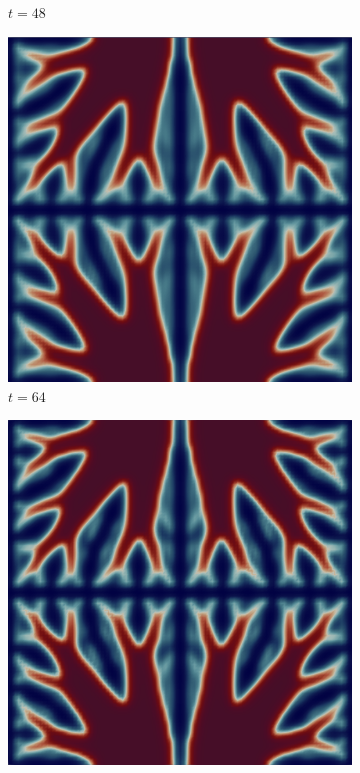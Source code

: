 \begin{figure}[H]
\begin{subfigure}{.4\textwidth}
        \caption{$t = 48$}
    \end{subfigure}
    \begin{subfigure}{.4\textwidth}
        \includegraphics[width=\textwidth]{imgs/UnitSquare2/fifth.png}
        \caption{$t = 64$}
    \end{subfigure}
    \begin{subfigure}{.4\textwidth}
        \includegraphics[width=\textwidth]{imgs/UnitSquare2/sixth.png}

\end{subfigure}
\end{figure}
